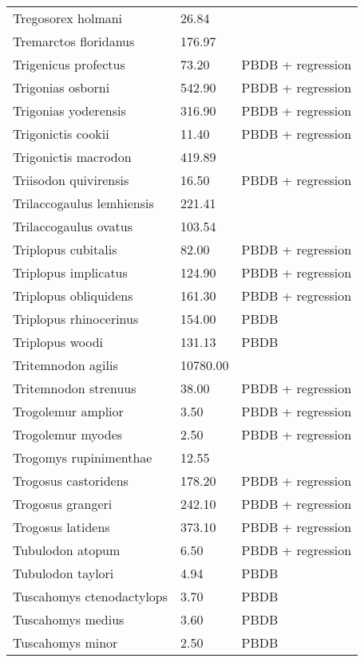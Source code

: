 \begin{longtable}{p{} p{} p{}}
    Tregosorex holmani & 26.84 & \cite{Tomiya2013} \\ 
    Tremarctos floridanus & 176.97 & \cite{Smith2004} \\ 
    Trigenicus profectus & 73.20 & PBDB + regression \\ 
    Trigonias osborni & 542.90 & PBDB + regression \\ 
    Trigonias yoderensis & 316.90 & PBDB + regression \\ 
    Trigonictis cookii & 11.40 & PBDB + regression \\ 
    Trigonictis macrodon & 419.89 & \cite{Tomiya2013} \\ 
    Triisodon quivirensis & 16.50 & PBDB + regression \\ 
    Trilaccogaulus lemhiensis & 221.41 & \cite{Tomiya2013} \\ 
    Trilaccogaulus ovatus & 103.54 & \cite{Tomiya2013} \\ 
    Triplopus cubitalis & 82.00 & PBDB + regression \\ 
    Triplopus implicatus & 124.90 & PBDB + regression \\ 
    Triplopus obliquidens & 161.30 & PBDB + regression \\ 
    Triplopus rhinocerinus & 154.00 & PBDB \\ 
    Triplopus woodi & 131.13 & PBDB \\ 
    Tritemnodon agilis & 10780.00 & \cite{Egi2001} \\ 
    Tritemnodon strenuus & 38.00 & PBDB + regression \\ 
    Trogolemur amplior & 3.50 & PBDB + regression \\ 
    Trogolemur myodes & 2.50 & PBDB + regression \\ 
    Trogomys rupinimenthae & 12.55 & \cite{Tomiya2013} \\ 
    Trogosus castoridens & 178.20 & PBDB + regression \\ 
    Trogosus grangeri & 242.10 & PBDB + regression \\ 
    Trogosus latidens & 373.10 & PBDB + regression \\ 
    Tubulodon atopum & 6.50 & PBDB + regression \\ 
    Tubulodon taylori & 4.94 & PBDB \\ 
    Tuscahomys ctenodactylops & 3.70 & PBDB \\ 
    Tuscahomys medius & 3.60 & PBDB \\ 
    Tuscahomys minor & 2.50 & PBDB \\ 

\end{longtable}
